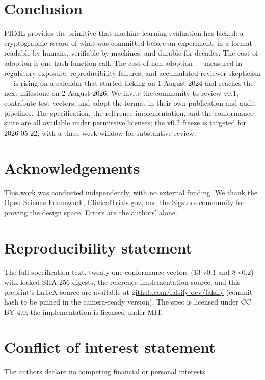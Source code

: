 \documentclass[11pt, a4paper]{article}
\begin{document}
\section{Conclusion}
\label{sec:conclusion}

PRML provides the primitive that machine-learning evaluation has lacked: a cryptographic record of what was committed before an experiment, in a format readable by humans, verifiable by machines, and durable for decades. The cost of adoption is one hash function call. The cost of non-adoption --- measured in regulatory exposure, reproducibility failures, and accumulated reviewer skepticism --- is rising on a calendar that started ticking on 1 August 2024 and reaches the next milestone on 2 August 2026. We invite the community to review v0.1, contribute test vectors, and adopt the format in their own publication and audit pipelines. The specification, the reference implementation, and the conformance suite are all available under permissive licenses; the v0.2 freeze is targeted for 2026-05-22, with a three-week window for substantive review.

\section*{Acknowledgements}

This work was conducted independently, with no external funding. We thank the Open Science Framework, ClinicalTrials.gov, and the Sigstore community for proving the design space. Errors are the authors' alone.

\section*{Reproducibility statement}

The full specification text, twenty-one conformance vectors (13 v0.1 and 8 v0.2) with locked SHA-256 digests, the reference implementation source, and this preprint's \LaTeX{} source are available at \href{https://github.com/falsify-dev/falsify}{github.com/falsify-dev/falsify} (commit hash to be pinned in the camera-ready version). The spec is licensed under CC BY 4.0; the implementation is licensed under MIT.

\section*{Conflict of interest statement}

The authors declare no competing financial or personal interests.
\end{document}
